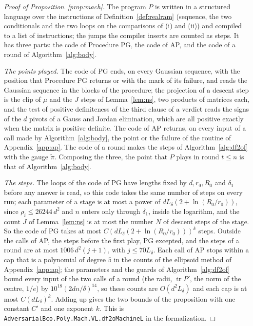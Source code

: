 \documentclass[11pt]{amsart}
\theoremstyle{definition}
\numberwithin{equation}{section}
\newcommand{\tr}{\operatorname{tr}}
\begin{document}
\begin{proof}[Proof of Proposition~\ref{prop:mach}]
The program $P$ is written in a structured language over the instructions of Definition~\ref{def:realram} (sequence, the two conditionals and the two loops on the comparisons of (i) and (ii)) and compiled to a list of instructions; the jumps the compiler inserts are counted as steps. It has three parts: the code of Procedure PG, the code of AP, and the code of a round of Algorithm~\ref{alg:body}.

\emph{The points played.} The code of PG ends, on every Gaussian sequence, with the position that Procedure PG returns or with the mark of its failure, and reads the Gaussian sequence in the blocks of the procedure; the projection of a descent step is the clip of $\mu$ and the $J$ steps of Lemma~\ref{lem:ns}, two products of matrices each, and the test of positive definiteness of the third clause of a verdict reads the signs of the $d$ pivots of a Gauss and Jordan elimination, which are all positive exactly when the matrix is positive definite. The code of AP returns, on every input of a call made by Algorithm~\ref{alg:body}, the point or the failure of the routine of Appendix~\ref{app:ap}. The code of a round makes the steps of Algorithm~\ref{alg:df2of} with the gauge $\tilde\pi$. Composing the three, the point that $P$ plays in round $t\le n$ is that of Algorithm~\ref{alg:body}.

\emph{The steps.} The loops of the code of PG have lengths fixed by $d,r_0,R_0$ and $\delta_1$ before any answer is read, so this code takes the same number of steps on every run; each parameter of a stage is at most a power of $dL_\delta(2+\ln(R_0/r_0))$, since $\rho_i\le26244\,d^2$ and $n$ enters only through $\delta_1$, inside the logarithm, and the count $J$ of Lemma~\ref{lem:ns} is at most the number $N$ of descent steps of the stage. So the code of PG takes at most $C(dL_\delta(2+\ln(R_0/r_0)))^k$ steps. Outside the calls of AP, the steps before the first play, PG excepted, and the steps of a round are at most $1006\,d^2(j+1)$, with $j\le70L_\delta$. Each call of AP stops within a cap that is a polynomial of degree $5$ in the counts of the ellipsoid method of Appendix~\ref{app:ap}; the parameters and the guards of Algorithm~\ref{alg:df2of} bound every input of the two calls of a round (the radii, $\tr P'$, the norm of the centre, $1/e$) by $10^{18}(2dn/\delta)^{14}$, so these counts are $O(d^2L_\delta)$ and each cap is at most $C(dL_\delta)^k$. Adding up gives the two bounds of the proposition with one constant $C'$ and one exponent $k$.
This is \texttt{AdversarialBco.Poly.Mach.VL.df2oMachineL} in the formalization.
\end{proof}
\end{document}
